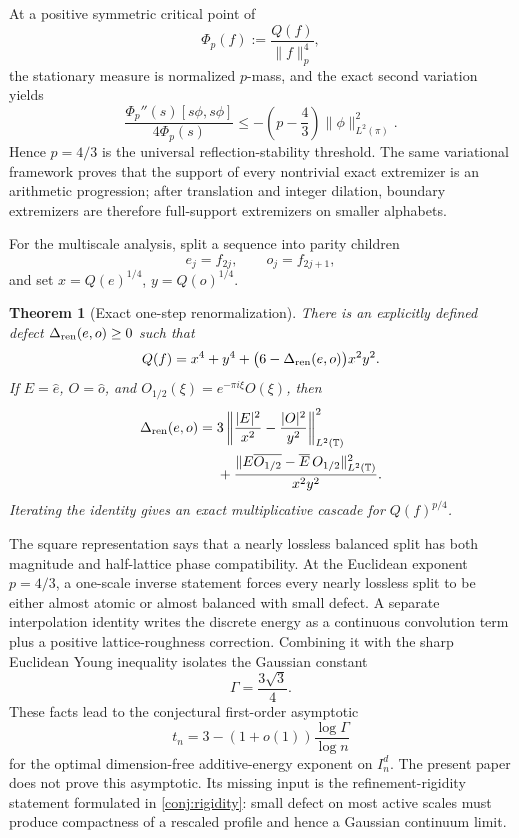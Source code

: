 \documentclass[11pt,reqno]{amsart}
\numberwithin{equation}{section}
\newtheorem{theorem}{Theorem}[section]
\theoremstyle{definition}
\theoremstyle{remark}
\newcommand{\T}{\mathbb T}
\begin{document}
At a positive symmetric critical point of
\[
  \Phi_p(f):=\frac{Q(f)}{\|f\|_p^4},
\]
the stationary measure is normalized $p$-mass, and the exact second variation yields
\begin{equation}\label{eq:intro-Hessian}
  \frac{\Phi_p''(s)[s\phi,s\phi]}{4\Phi_p(s)}
  \le-\left(p-\frac43\right)\|\phi\|_{L^2(\pi)}^2.
\end{equation}
Hence $p=4/3$ is the universal reflection-stability threshold.  The same variational framework proves that the support of every nontrivial exact extremizer is an arithmetic progression; after translation and integer dilation, boundary extremizers are therefore full-support extremizers on smaller alphabets.

For the multiscale analysis, split a sequence into parity children
\[
  e_j=f_{2j},
  \qquad
  o_j=f_{2j+1},
\]
and set $x=Q(e)^{1/4}$, $y=Q(o)^{1/4}$.

\begin{theorem}[Exact one-step renormalization]\label{thm:intro-renorm}
There is an explicitly defined defect $\Delta_{\rm ren}(e,o)\ge0$ such that
\begin{equation}\label{eq:intro-renorm}
  Q(f)=x^4+y^4+\bigl(6-\Delta_{\rm ren}(e,o)\bigr)x^2y^2.
\end{equation}
If $E=\widehat e$, $O=\widehat o$, and $O_{1/2}(\xi)=e^{-\pi i\xi}O(\xi)$, then
\begin{equation}\label{eq:intro-renorm-squares}
\begin{aligned}
  \Delta_{\rm ren}(e,o)
  ={}&3\left\|
  \frac{|E|^2}{x^2}-\frac{|O|^2}{y^2}
  \right\|_{L^2(\T)}^2\\
  &+\frac{\|E\overline{O_{1/2}}-\overline E\,O_{1/2}\|_{L^2(\T)}^2}
  {x^2y^2}.
\end{aligned}
\end{equation}
Iterating the identity gives an exact multiplicative cascade for $Q(f)^{p/4}$.
\end{theorem}

The square representation says that a nearly lossless balanced split has both magnitude and half-lattice phase compatibility.  At the Euclidean exponent $p=4/3$, a one-scale inverse statement forces every nearly lossless split to be either almost atomic or almost balanced with small defect.  A separate interpolation identity writes the discrete energy as a continuous convolution term plus a positive lattice-roughness correction.  Combining it with the sharp Euclidean Young inequality isolates the Gaussian constant
\[
  \Gamma=\frac{3\sqrt3}{4}.
\]
These facts lead to the conjectural first-order asymptotic
\[
  t_n=3-(1+o(1))\frac{\log\Gamma}{\log n}
\]
for the optimal dimension-free additive-energy exponent on $I_n^d$.  The present paper does not prove this asymptotic.  Its missing input is the refinement-rigidity statement formulated in \cref{conj:rigidity}: small defect on most active scales must produce compactness of a rescaled profile and hence a Gaussian continuum limit.
\end{document}
